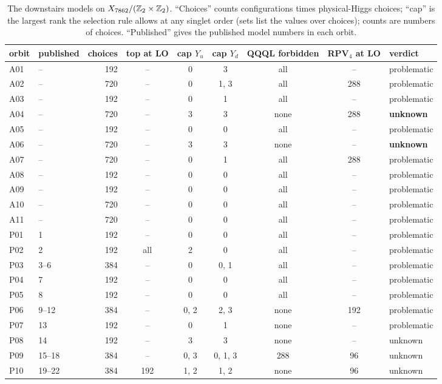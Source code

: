 \begin{table}[t]
\centering\small
\setlength{\tabcolsep}{4pt}
\begin{tabular}{@{}llrcccccl@{}}
\toprule
orbit & published & choices & top at LO & cap $Y_u$ & cap $Y_d$ & QQQL forbidden & RPV$_4$ at LO & verdict \\
\midrule
A01 & -- & 192 & -- & 0 & 3 & all & -- & problematic \\
A02 & -- & 720 & -- & 0 & 1, 3 & all & 288 & problematic \\
A03 & -- & 192 & -- & 0 & 1 & all & -- & problematic \\
A04 & -- & 720 & -- & 3 & 3 & none & 288 & \textbf{unknown} \\
A05 & -- & 192 & -- & 0 & 0 & all & -- & problematic \\
A06 & -- & 720 & -- & 3 & 3 & none & -- & \textbf{unknown} \\
A07 & -- & 720 & -- & 0 & 1 & all & 288 & problematic \\
A08 & -- & 192 & -- & 0 & 0 & all & -- & problematic \\
A09 & -- & 192 & -- & 0 & 0 & all & -- & problematic \\
A10 & -- & 720 & -- & 0 & 0 & all & -- & problematic \\
A11 & -- & 720 & -- & 0 & 0 & all & -- & problematic \\
\midrule
P01 & 1 & 192 & -- & 0 & 0 & all & -- & problematic \\
P02 & 2 & 192 & all & 2 & 0 & all & -- & problematic \\
P03 & 3--6 & 384 & -- & 0 & 0, 1 & all & -- & problematic \\
P04 & 7 & 192 & -- & 0 & 0 & all & -- & problematic \\
P05 & 8 & 192 & -- & 0 & 0 & all & -- & problematic \\
P06 & 9--12 & 384 & -- & 0, 2 & 2, 3 & none & 192 & problematic \\
P07 & 13 & 192 & -- & 0 & 1 & none & -- & problematic \\
P08 & 14 & 192 & -- & 3 & 3 & none & -- & unknown \\
P09 & 15--18 & 384 & -- & 0, 3 & 0, 1, 3 & 288 & 96 & unknown \\
P10 & 19--22 & 384 & 192 & 1, 2 & 1, 2 & none & 96 & unknown \\
\bottomrule
\end{tabular}
\caption{The downstairs models on $X_{7862}/(\mathbb{Z}_2\times\mathbb{Z}_2)$. ``Choices'' counts
configurations times physical-Higgs choices; ``cap'' is the largest rank the
selection rule allows at any singlet order (sets list the values over choices);
counts are numbers of choices. ``Published'' gives the published model numbers
in each orbit.}
\label{tab:ranking}
\end{table}

